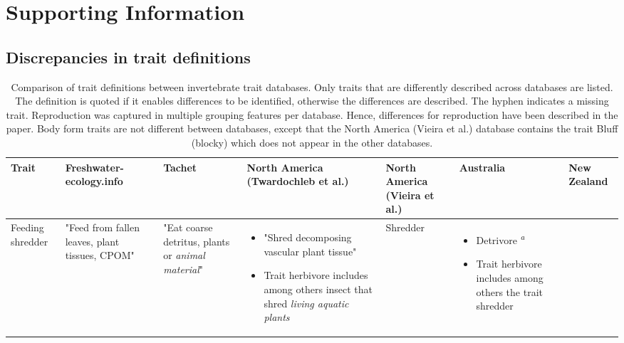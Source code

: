\documentclass[../Draft_harmonization_paper.tex]{subfiles}
\begin{document}
\section*{Supporting Information}
\label{sec:SI}

\subsection*{Discrepancies in trait definitions}

\begin{landscape}
    \begin{longtable}{m{1.8cm}|m{3cm}|m{3cm}|m{3cm}|m{3cm}|m{3.2cm}|m{3cm}}
        \caption{Comparison of trait definitions between invertebrate trait databases. Only traits that are differently described across databases are listed. The definition is quoted if it enables differences to be identified, otherwise the differences are described. The hyphen indicates a missing trait. Reproduction was captured in multiple grouping features per database. Hence, differences for reproduction have been described in the paper. Body form traits are not different between databases, except that the North America (Vieira et al.) database contains the trait Bluff (blocky) which does not appear in the other databases.}
        \label{stab:trait_definitions}
        \endfirsthead
        \toprule[.1em]
        Trait & \specialcell{Freshwater- \\ ecology.info} & Tachet & \specialcell{North America \\ (Twardochleb et al.)} & 
        North America (Vieira et al.) & Australia & New Zealand \\
        \toprule[.1em]
        Feeding shredder & 
        "Feed from fallen leaves, plant tissues, CPOM" & 
        "Eat coarse detritus, plants or \textit{animal material}" & 
        \begin{itemize}
            \item "Shred decomposing vascular plant tissue"
            \item Trait herbivore includes among others insect that shred \textit{living aquatic plants} 
        \end{itemize} & 
        Shredder & 
        \begin{itemize}
            \item Detrivore \textsuperscript{\textit{a}}
            \item Trait herbivore includes among others the trait shredder
        \end{itemize} & 

\end{longtable}
\end{landscape}
\end{document}
